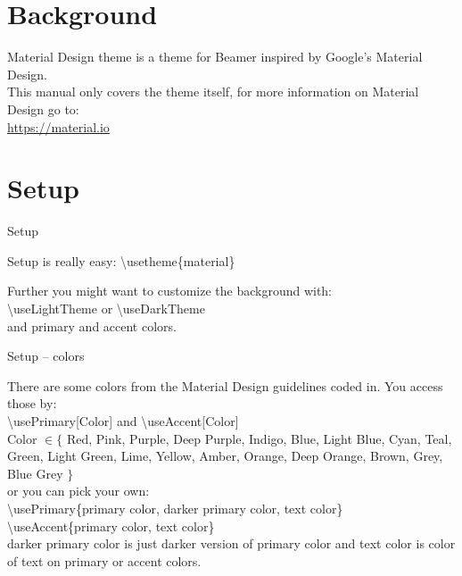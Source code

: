 \documentclass[9pt, aspectratio=169]{beamer}
\begin{document}

\section{Background}




\begin{frame}
\begin{card}
Material Design theme is a theme for Beamer inspired by Google's Material Design. \\[5mm]
This manual only covers the theme itself, for more information on Material Design go to: 
\\\url{https://material.io}
\end{card}
\end{frame}
\section{Setup}
\begin{frame}{Setup}
\begin{card}
Setup is really easy: 
{\color{primary}\textbackslash usetheme\{material\}}
\end{card}
\begin{card}
Further you might want to customize the background with: \\[2mm]
{\color{primary}\textbackslash useLightTheme} or {\color{primary}\textbackslash useDarkTheme} \\[2mm]
and primary and accent colors.
\end{card}
\end{frame}

\begin{frame}{Setup -- colors}
\begin{card}
There are some colors from the Material Design guidelines coded in. You access those by: \\[2mm]
{\color{primary} \textbackslash usePrimary[Color]} and {\color{primary}\textbackslash useAccent[Color]}\\[2mm]
{\tiny {\color{primary}Color} $\in \{$ Red, Pink, Purple, Deep Purple, Indigo, Blue, Light Blue, Cyan, Teal, Green, Light Green, Lime, Yellow, Amber, Orange, Deep Orange, Brown, Grey, Blue Grey $\}$} \\[2mm]
or you can pick your own:\\[2mm]
{\color{primary} \textbackslash usePrimary\{primary color, darker primary color, text color\}}
{\color{primary} \textbackslash useAccent\{primary color, text color\}}\\[2mm]
{\color{primary} darker primary color} is just darker version of {\color{primary} primary color} and {\color{primary} text color} is color of text on {\color{primary} primary} or {\color{primary} accent colors}.
\end{card}
\end{frame}
\end{document}
